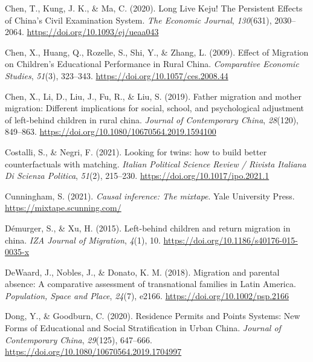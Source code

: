 \documentclass[
  man,floatsintext]{apa7}
\newlength{\cslhangindent}
\newlength{\cslentryspacingunit} %
\newenvironment{CSLReferences}[2] %
 {%
  \setlength{\parindent}{0pt}
  \ifodd #1
  \let\oldpar\par
  \def\par{\hangindent=\cslhangindent\oldpar}
  \fi
  \setlength{\parskip}{#2\cslentryspacingunit}
 }%
 {}
\begin{document}
\begin{CSLReferences}{1}{0}
\leavevmode{}%
Chen, T., Kung, J. K., \& Ma, C. (2020). Long Live Keju! The Persistent Effects of China{'}s Civil Examination System. \emph{The Economic Journal}, \emph{130}(631), 2030--2064. \url{https://doi.org/10.1093/ej/ueaa043}

\leavevmode{}%
Chen, X., Huang, Q., Rozelle, S., Shi, Y., \& Zhang, L. (2009). Effect of Migration on Children's Educational Performance in Rural China. \emph{Comparative Economic Studies}, \emph{51}(3), 323--343. \url{https://doi.org/10.1057/ces.2008.44}

\leavevmode{}%
Chen, X., Li, D., Liu, J., Fu, R., \& Liu, S. (2019). Father migration and mother migration: Different implications for social, school, and psychological adjustment of left-behind children in rural china. \emph{Journal of Contemporary China}, \emph{28}(120), 849--863. \url{https://doi.org/10.1080/10670564.2019.1594100}

\leavevmode{}%
Costalli, S., \& Negri, F. (2021). Looking for twins: how to build better counterfactuals with matching. \emph{Italian Political Science Review / Rivista Italiana Di Scienza Politica}, \emph{51}(2), 215--230. \url{https://doi.org/10.1017/ipo.2021.1}

\leavevmode{}%
Cunningham, S. (2021). \emph{Causal inference: The mixtape}. Yale University Press. \url{https://mixtape.scunning.com/}

\leavevmode{}%
Démurger, S., \& Xu, H. (2015). Left-behind children and return migration in china. \emph{IZA Journal of Migration}, \emph{4}(1), 10. \url{https://doi.org/10.1186/s40176-015-0035-x}

\leavevmode{}%
DeWaard, J., Nobles, J., \& Donato, K. M. (2018). Migration and parental absence: A comparative assessment of transnational families in Latin America. \emph{Population, Space and Place}, \emph{24}(7), e2166. \url{https://doi.org/10.1002/psp.2166}

\leavevmode{}%
Dong, Y., \& Goodburn, C. (2020). Residence Permits and Points Systems: New Forms of Educational and Social Stratification in Urban China. \emph{Journal of Contemporary China}, \emph{29}(125), 647--666. \url{https://doi.org/10.1080/10670564.2019.1704997}


\end{CSLReferences}
\end{document}
